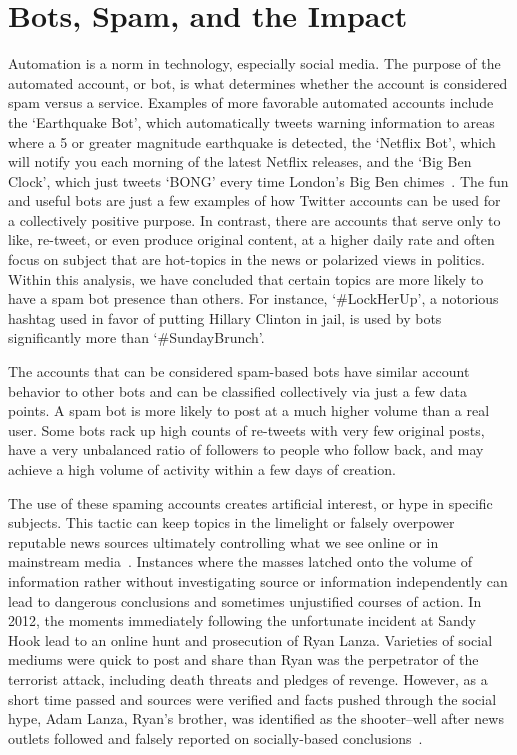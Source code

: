 \section{Bots, Spam, and the Impact}

Automation is a norm in technology, especially social media. The purpose of the
automated account, or bot, is what determines whether the account is considered
spam versus a service. Examples of more favorable automated accounts include
the `Earthquake Bot', which automatically tweets warning information to areas
where a 5 or greater magnitude earthquake is detected, the `Netflix Bot', which
will notify you each morning of the latest Netflix releases, and the `Big Ben
Clock', which just tweets `BONG' every time London's Big Ben
chimes~\cite{cooltwitterbots}. The fun and useful bots are just a few examples
of how Twitter accounts can be used for a collectively positive purpose. In
contrast, there are accounts that serve only to like, re-tweet, or even produce
original content, at a higher daily rate and often focus on subject that are
hot-topics in the news or polarized views in politics. Within this analysis, we
have concluded that certain topics are more likely to have a spam bot presence
than others. For instance, `\#LockHerUp', a notorious hashtag used in favor of
putting Hillary Clinton in jail, is used by bots significantly more than
`\#SundayBrunch'.

The accounts that can be considered spam-based bots have similar account
behavior to other bots and can be classified collectively via just a few data
points. A spam bot is more likely to post at a much higher volume than a real
user. Some bots rack up high counts of re-tweets with very few original posts,
have a very unbalanced ratio of followers to people who follow back, and may
achieve a high volume of activity within a few days of creation.

The use of these spaming accounts creates artificial interest, or hype in
specific subjects. This tactic can keep topics in the limelight or falsely
overpower reputable news sources ultimately controlling what we see online or
in mainstream media~\cite{wikitwitterbot}. Instances where the masses latched
onto the volume of information rather without investigating source or
information independently can lead to dangerous conclusions and sometimes
unjustified courses of action. In 2012, the moments immediately following the
unfortunate incident at Sandy Hook lead to an online hunt and prosecution of
Ryan Lanza.  Varieties of social mediums were quick to post and share than Ryan
was the perpetrator of the terrorist attack, including death threats and
pledges of revenge. However, as a short time passed and sources were verified
and facts pushed through the social hype, Adam Lanza, Ryan's brother, was
identified as the shooter--well after news outlets followed and falsely
reported on socially-based conclusions~\cite{SandyHookForbes}.

